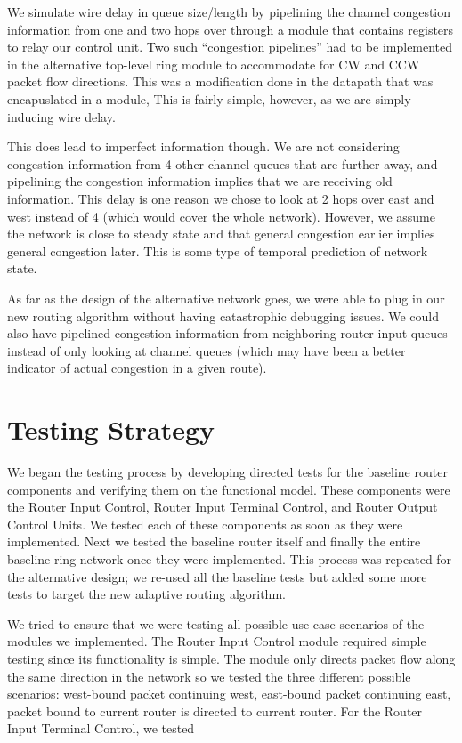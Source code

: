 \documentclass[10pt]{article}
\begin{document}
We simulate wire delay in queue size/length by pipelining the channel congestion
information from one and two hops over through a module that contains registers 
to relay our control unit. Two such ``congestion pipelines'' had to be implemented
in the alternative top-level ring module to accommodate for CW and CCW packet flow
directions.
This was a modification done in the datapath that was encapuslated in a 
module, 
This is fairly simple, however, as we are simply inducing wire delay. \par
This does lead to imperfect information though. We are not considering congestion 
information from 4 other channel queues that are further away, and pipelining the 
congestion information implies that we are receiving old information. This delay 
is one reason we chose to look at 2 hops over east and west instead of 4 (which 
would cover the whole network). 
However, we assume the network is close to steady state and that general 
congestion earlier implies general congestion later. 
This is some type of temporal prediction of network state. \par

As far as the design of the alternative network goes, we were able to plug in our
new routing algorithm without having catastrophic debugging issues. We could also 
have pipelined congestion information from neighboring router input queues instead 
of only looking at channel queues (which may have been a better indicator of actual
congestion in a given route). 

\section{Testing Strategy}

We began the testing process by developing directed tests for the baseline router 
components and verifying them on the functional model. These components were the 
Router Input Control, Router Input Terminal Control, and Router Output Control 
Units. We tested each of these components as soon as they were implemented. Next
we tested the baseline router itself and finally the entire baseline ring network
once they were implemented. This process was repeated for the alternative 
design; we re-used all the baseline tests but added some more tests to target the 
new adaptive routing algorithm. 

We tried to ensure that we were testing all possible use-case scenarios of the modules
we implemented. The Router Input Control module required simple testing since its
functionality is simple. The module only directs packet flow along the same 
direction in the network so we tested the three different possible scenarios: west-bound packet
continuing west, east-bound packet continuing east, packet bound to current router is 
directed to current router. For the Router Input Terminal Control, we tested 
\end{document}
